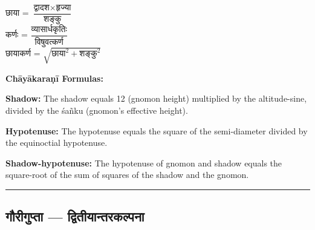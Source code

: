 \documentclass[11pt,a4paper]{article}
\newcommand{\longline}{\noindent\rule{\textwidth}{0.4pt}}
\newcommand{\dev}[1]{{\devanagarifont #1}}
\newcommand{\sectsep}{\par\vspace{0.8em}\longline\vspace{0.8em}}
\begin{document}
\begin{minipage}[t]{0.48\textwidth}
\small\devanagarifont
छाया = $\dfrac{\text{द्वादश} \times \text{हृज्या}}{\text{शङ्कु}}$\\[0.8em]
कर्णः = $\dfrac{\text{व्यासार्धकृतिः}}{\text{विषुवत्कर्ण}}$\\[0.8em]
छायाकर्ण = $\sqrt{\text{छाया}^2 + \text{शङ्कु}^2}$
\end{minipage}%
\hfill
\begin{minipage}[t]{0.48\textwidth}
\small
\textbf{Ch\=ay\=akara\d{n}\=i Formulas:}

\textbf{Shadow:} The shadow equals 12 (gnomon height) multiplied by the altitude-sine, divided by the \'sa\~nku (gnomon's effective height).

\textbf{Hypotenuse:} The hypotenuse equals the square of the semi-diameter divided by the equinoctial hypotenuse.

\textbf{Shadow-hypotenuse:} The hypotenuse of gnomon and shadow equals the square-root of the sum of squares of the shadow and the gnomon.
\end{minipage}

\sectsep

\subsection{\dev{गौरीगुप्ता --- द्वितीयान्तरकल्पना}}
\label{subsec:gaurigupta}
\end{document}
